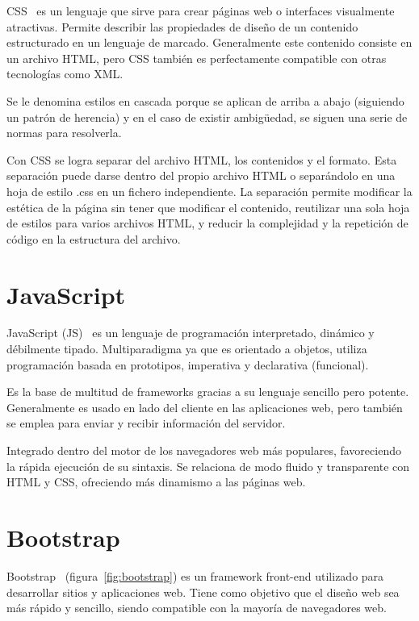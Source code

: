 \documentclass[a4paper, 12pt]{book}
\begin{document}
CSS~\cite{css} es un lenguaje que sirve para crear páginas web o interfaces visualmente atractivas.
Permite describir las propiedades de diseño de un contenido estructurado en un lenguaje de marcado.
Generalmente este contenido consiste en un archivo HTML, pero CSS también es perfectamente compatible con otras tecnologías como XML.

\vspace{5mm}
Se le denomina estilos en cascada porque se aplican de arriba a abajo (siguiendo un patrón de herencia) y en el caso de existir ambigüedad, se siguen una serie de normas para resolverla.

\vspace{5mm}
Con CSS se logra separar del archivo HTML, los contenidos y el formato.
Esta separación puede darse dentro del propio archivo HTML o separándolo en una hoja de estilo .css en un fichero independiente. 
La separación permite modificar la estética de la página sin tener que modificar el contenido, reutilizar una sola hoja de estilos para varios archivos HTML, y reducir la complejidad y la repetición de código en la estructura del archivo.


\section{JavaScript} 
\label{sec:javascript}

JavaScript (JS)~\cite{gauchat2012gran} es un lenguaje de programación interpretado, dinámico y débilmente tipado.
Multiparadigma ya que es orientado a objetos, utiliza programación basada en prototipos, imperativa y declarativa (funcional).

\vspace{5mm}
Es la base de multitud de frameworks gracias a su lenguaje sencillo pero potente. 
Generalmente es usado en lado del cliente en las aplicaciones web, pero también se emplea para enviar y recibir información del servidor.

\vspace{5mm}
Integrado dentro del motor de los navegadores web más populares, favoreciendo la rápida ejecución de su sintaxis.
Se relaciona de modo fluido y transparente con HTML y CSS, ofreciendo más dinamismo a las páginas web.


\section{Bootstrap} 
\label{sec:bootstrap}

Bootstrap~\cite{bootstrap} (figura~\ref{fig:bootstrap}) es un framework front-end utilizado para desarrollar sitios y aplicaciones web.
Tiene como objetivo que el diseño web sea más rápido y sencillo, siendo compatible con la mayoría de navegadores web.
\end{document}
